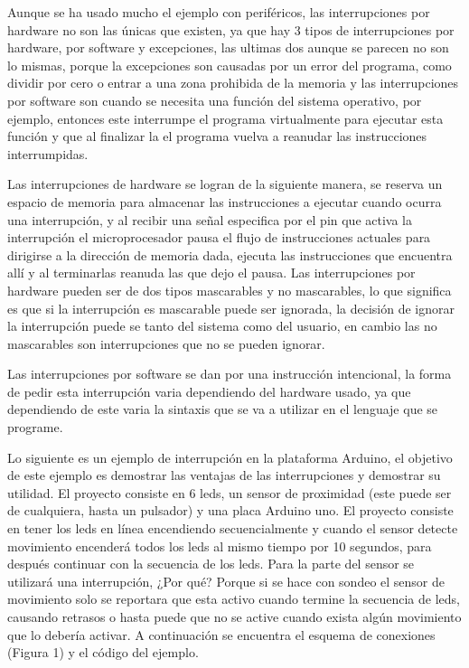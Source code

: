 \documentclass[12pt]{article}
\begin{document}
\vspace{10}

Aunque se ha usado mucho el ejemplo con periféricos, las interrupciones por hardware no son las únicas que existen, ya que hay 3 tipos de interrupciones por hardware, por software y excepciones, las ultimas dos aunque se parecen no son lo mismas, porque la excepciones son causadas por un error del programa, como dividir por cero o entrar a una zona prohibida de la memoria y las interrupciones por software son cuando se necesita una función del sistema operativo, por ejemplo, entonces este interrumpe el programa virtualmente para ejecutar esta función y que al finalizar la el programa vuelva a reanudar las instrucciones interrumpidas.\cite{microprocesadoresUNAD}

\vspace{10}

Las interrupciones de hardware se logran de la siguiente manera, se reserva un espacio de memoria para almacenar las instrucciones a ejecutar cuando ocurra una interrupción, y al recibir una señal especifica por el pin que activa la interrupción el microprocesador pausa el flujo de instrucciones actuales para dirigirse a la dirección de memoria dada, ejecuta las instrucciones que encuentra allí y al terminarlas reanuda las que dejo el pausa. Las interrupciones por hardware pueden ser de dos tipos mascarables y no mascarables, lo que significa es que si la interrupción es mascarable puede ser ignorada, la decisión de ignorar la interrupción puede se tanto del sistema como del usuario, en cambio las no mascarables son interrupciones que no se pueden ignorar.

\vspace{10}

Las interrupciones por software se dan por una instrucción intencional, la forma de pedir esta interrupción varia dependiendo del hardware usado, ya que dependiendo de este varia la sintaxis que se va a utilizar en el lenguaje que se programe.

\vspace{10}

Lo siguiente es un ejemplo de interrupción en la plataforma Arduino, el objetivo de este ejemplo es demostrar las ventajas de las interrupciones y demostrar su utilidad. El proyecto consiste en 6 leds, un sensor de proximidad (este puede ser de cualquiera, hasta un pulsador) y una placa Arduino uno. El proyecto consiste en tener los leds en línea encendiendo secuencialmente y cuando el sensor detecte movimiento encenderá todos los leds al mismo tiempo por 10 segundos, para después continuar con la secuencia de los leds. Para la parte del sensor se utilizará una interrupción, ¿Por qué? Porque si se hace con sondeo el sensor de movimiento solo se reportara que esta activo cuando termine la secuencia de leds, causando retrasos o hasta puede que no se active cuando exista algún movimiento que lo debería activar. A continuación se encuentra el esquema de conexiones (Figura 1) y el código del ejemplo.
\end{document}
